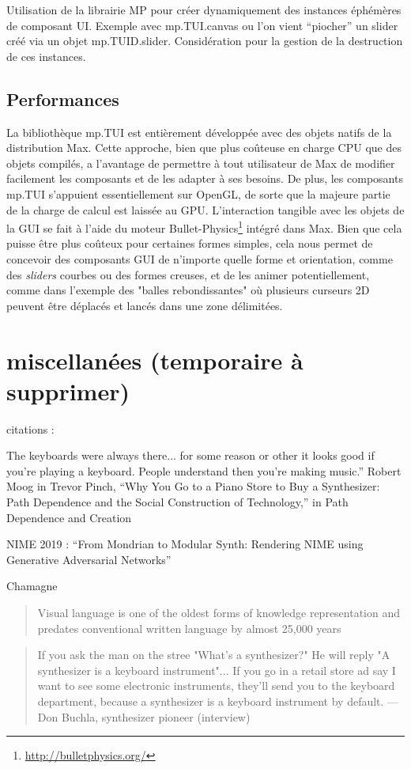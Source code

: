 Utilisation de la librairie MP pour créer dynamiquement des instances éphémères de composant UI.
Exemple avec mp.TUI.canvas ou l'on vient ``piocher'' un slider créé via un objet mp.TUID.slider.
Considération pour la gestion de la destruction de ces instances.


\subsection{Performances}
La bibliothèque mp.TUI est entièrement développée avec des objets natifs de la distribution Max. Cette approche, bien que plus coûteuse en charge \gls{CPU} que des objets compilés, a l'avantage de permettre à tout utilisateur de Max de modifier facilement les composants et de les adapter à ses besoins. De plus, les composants mp.TUI s'appuient essentiellement sur OpenGL, de sorte que la majeure partie de la charge de calcul est laissée au \gls{GPU}. L'interaction tangible avec les objets de la \gls{GUI} se fait à l'aide du moteur Bullet-Physics\footnote{\url{http://bulletphysics.org/}} intégré dans Max. Bien que cela puisse être plus coûteux pour certaines formes simples, cela nous permet de concevoir des composants \gls{GUI} de n'importe quelle forme et orientation, comme des \textit{sliders} courbes ou des formes creuses, et de les animer potentiellement, comme dans l'exemple des "balles rebondissantes" où plusieurs curseurs 2D peuvent être déplacés et lancés dans une zone délimitées.

\section*{miscellanées (temporaire à supprimer)}
citations :

The  keyboards  were  always  there...  for  some  reason  or  other  it  looks  good  if  you’re playing a keyboard. People understand then you’re making music.” Robert Moog in Trevor Pinch, “Why You Go to a Piano Store to Buy a Synthesizer: Path Dependence and the Social Construction of Technology,” in Path Dependence and Creation


NIME 2019 : ``From Mondrian to Modular Synth: Rendering NIME using Generative Adversarial Networks''

Chamagne

\begin{quote}
Visual language is one of the oldest forms of knowledge representation and predates conventional written language by almost 25,000 years
\end{quote}
\cite{tufte_visual_2001}

\cite{moody_physics_2009}


\begin{quotation}
If you ask the man on the stree "What's a synthesizer?" He will reply "A synthesizer is a keyboard instrument"... If you go in a retail store ad say I want to see some electronic instruments, they'll send you to the keyboard department, because a synthesizer is a keyboard instrument by default. — Don Buchla, synthesizer pioneer (interview)
\end{quotation}
\cite{pinch_why_2001}